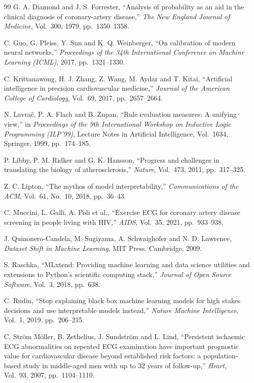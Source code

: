 \documentclass[a4paper,12pt,oneside]{book}
\begin{document}
\begin{thebibliography}{99}
G. A. Diamond and J. S. Forrester, ``Analysis of probability as an aid in the clinical diagnosis of coronary-artery disease,'' {\em The New England Journal of Medicine}, Vol.~300, 1979, pp.~1350--1358.

C. Guo, G. Pleiss, Y. Sun and K. Q. Weinberger, ``On calibration of modern neural networks,'' {\em Proceedings of the 34th International Conference on Machine Learning (ICML)}, 2017, pp.~1321--1330.

C. Krittanawong, H. J. Zhang, Z. Wang, M. Aydar and T. Kitai, ``Artificial intelligence in precision cardiovascular medicine,'' {\em Journal of the American College of Cardiology}, Vol.~69, 2017, pp.~2657--2664.

N. Lavra\v{c}, P. A. Flach and B. Zupan, ``Rule evaluation measures: A unifying view,'' in {\em Proceedings of the 9th International Workshop on Inductive Logic Programming (ILP'99)}, Lecture Notes in Artificial Intelligence, Vol.~1634, Springer, 1999, pp.~174--185.

P. Libby, P. M. Ridker and G. K. Hansson, ``Progress and challenges in translating the biology of atherosclerosis,'' {\em Nature}, Vol.~473, 2011, pp.~317--325.

Z. C. Lipton, ``The mythos of model interpretability,'' {\em Communications of the ACM}, Vol.~61, No.~10, 2018, pp.~36--43.

C. Muccini, L. Galli, A. Poli et al., ``Exercise ECG for coronary artery disease screening in people living with HIV,'' {\em AIDS}, Vol.~35, 2021, pp.~933--938.

J. Quinonero-Candela, M. Sugiyama, A. Schwaighofer and N. D. Lawrence, {\em Dataset Shift in Machine Learning}, MIT Press, Cambridge, 2009.

S. Raschka, ``MLxtend: Providing machine learning and data science utilities and extensions to Python's scientific computing stack,'' {\em Journal of Open Source Software}, Vol.~3, 2018, pp.~638.

C. Rudin, ``Stop explaining black box machine learning models for high stakes decisions and use interpretable models instead,'' {\em Nature Machine Intelligence}, Vol.~1, 2019, pp.~206--215.

C. Str\"{o}m M\"{o}ller, B. Zethelius, J. Sundstr\"{o}m and L. Lind, ``Persistent ischaemic ECG abnormalities on repeated ECG examination have important prognostic value for cardiovascular disease beyond established risk factors: a population-based study in middle-aged men with up to 32 years of follow-up,'' {\em Heart}, Vol.~93, 2007, pp.~1104--1110.


\end{thebibliography}
\end{document}

